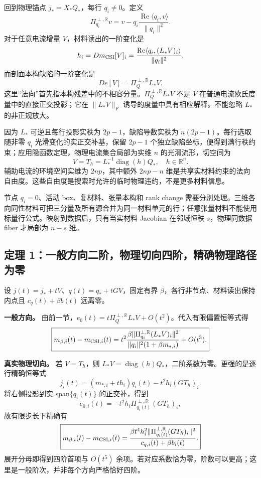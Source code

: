 \documentclass[10pt,a4paper]{article}
\begin{document}
回到物理锚点 \(j_*=X_*Q_*\)，每行 \(q_i\ne0\)。定义
\[\Pi_{q_i}^{\perp,\mathbb R}v
=v-q_i\frac{\operatorname{Re}\langle q_i,v\rangle}{\|q_i\|^2}.\]
对于任意电流增量 \(V\)，材料读出的一阶变化是 \[h_i= Dm_{\rm CSI}[V]_i
=\frac{\operatorname{Re}\langle q_i,(L_*V)_i\rangle}{\|q_i\|^2},\]
而剖面本构缺陷的一阶变化是
\[\boxed{De[V]=\Pi_Q^{\perp,\mathbb R}L_*V.}\]
这里``法向''首先指本构残差中的不相容分量。\(\Pi_Q^{\perp,\mathbb R}L_*V\)
不是 \(V\) 在普通电流欧氏度量中的直接正交投影；它在 \(\|L_*V\|_F\)
诱导的度量中具有相应解释。不能忽略 \(L_*\) 的非正规放大。

因为 \(L_*\) 可逆且每行投影实秩为 \(2p-1\)，缺陷导数实秩为
\(n(2p-1)\)。每行选取随非零 \(q_i\) 光滑变化的实正交补基，保留 \(2p-1\)
个独立缺陷坐标，便得到满行秩约束；应用隐函数定理，物理电流集合局部为实维
\(n\) 的光滑流形，切空间为
\[\boxed{V=T_h=L_*^{-1}\operatorname{diag}(h)Q_*,\quad h\in\mathbb R^n.}\]
辅助电流的环境空间实维为 \(2np\)，其中额外 \(2np-n\)
维是共享实材料约束的法向自由度。这些自由度是搜索时允许的临时物理违约，不是更多材料信息。

节点 \(q_i=0\)、活动 box、复材料、张量本构和 rank change
需要分别处理。三维各向同性材料可把三分量及所有源合并为同一材料单元的行；任意张量材料不能使用标量行公式。映射到数据后，只有当实材料
Jacobian 在邻域恒秩 \(s\)，物理同数据 fiber 才局部为 \(n-s\) 维。

\hypertarget{ux5b9aux7406-1ux4e00ux822cux65b9ux5411ux4e8cux9636ux7269ux7406ux5207ux5411ux56dbux9636ux7cbeux786eux7269ux7406ux8defux5f84ux4e3aux96f6}{%
\subsection{定理
1：一般方向二阶，物理切向四阶，精确物理路径为零}\label{ux5b9aux7406-1ux4e00ux822cux65b9ux5411ux4e8cux9636ux7269ux7406ux5207ux5411ux56dbux9636ux7cbeux786eux7269ux7406ux8defux5f84ux4e3aux96f6}}

设 \(j(t)=j_*+tV\)、\(q(t)=q_*+tGV\)，固定有界
\(\beta\)，各行非节点、材料读出保持内点且 \(c_q(t)+\beta b(t)\) 远离零。

\textbf{一般方向。}
由前一节，\(e_0(t)=t\Pi_Q^{\perp,\mathbb R}L_*V+O(t^2)\)。代入有限偏置恒等式得
\[\boxed{m_{\beta,i}(t)-m_{{\rm CSI},i}(t)
=t^2\frac{\beta\|\Pi_{q_i}^{\perp,\mathbb R}(L_*V)_i\|^2}
{\|q_i\|^2(1+\beta m_{*,i})}+O(t^3).}\]

\textbf{真实物理切向。} 若 \(V=T_h\)，则
\(L_*V=\operatorname{diag}(h)Q_*\)，二阶系数为零。更强的是逐行精确恒等式
\[j_i(t)=(m_{*,i}+th_i)q_i(t)-t^2h_i(GT_h)_i.\] 将右侧投影到实
span\(\{q_i(t)\}\) 的正交补，得到
\[e_{0,i}(t)=-t^2h_i\Pi_{q_i(t)}^{\perp,\mathbb R}(GT_h)_i,\]
故有限步长下精确有 \[\boxed{m_{\beta,i}(t)-m_{{\rm CSI},i}(t)=
\frac{\beta t^4h_i^2\|\Pi_{q_i(t)}^{\perp,\mathbb R}(GT_h)_i\|^2}
{c_{q,i}(t)+\beta b_i(t)}.}\] 展开分母即得到四阶首项与 \(O(t^5)\)
余项。若对应系数恰为零，阶数可以更高；这里是一般阶次，并非每个方向严格恰好四阶。
\end{document}
